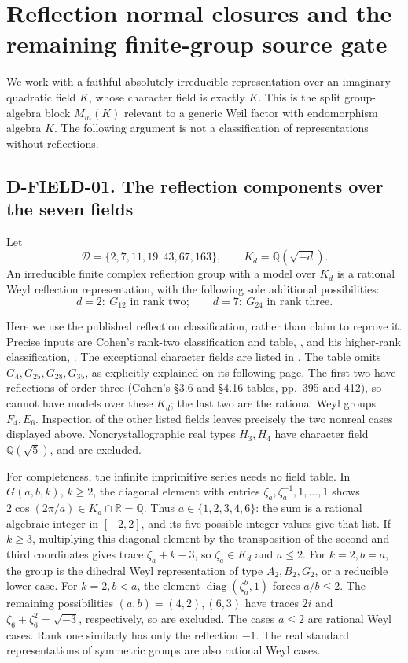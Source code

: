 \section{Reflection normal closures and the remaining finite-group source gate}
\label{sec:reflection-reduction}

We work with a faithful absolutely irreducible representation over an
imaginary quadratic field \(K\), whose character field is exactly \(K\).
This is the split group-algebra block \(M_m(K)\) relevant to a generic
Weil factor with endomorphism algebra \(K\). The following argument is
not a classification of representations without reflections.

\subsection*{D-FIELD-01. The reflection components over the seven fields}

Let
\[
 \mathcal D=\{2,7,11,19,43,67,163\},\qquad K_d=\mathbb Q(\sqrt{-d}).
\]
An irreducible finite complex reflection group with a model over \(K_d\)
is a rational Weyl reflection representation, with the following sole
additional possibilities:
\[
  d=2:\ G_{12}\text{ in rank two};\qquad
  d=7:\ G_{24}\text{ in rank three}.
\]

Here we use the published reflection classification, rather than claim
to reprove it. Precise inputs are Cohen's rank-two classification and
table, \cite[\S\S3.4--3.6, pp.~394--395]{FIELD:Cohen}, and his
higher-rank classification, \cite[Theorem 5.12, p.~435]{FIELD:Cohen}.
The exceptional character fields are listed in
\cite[Tables 8.1--8.2, pp.~674--675]{FIELD:Malle}.
The table omits \(G_4,G_{25},G_{28},G_{35}\), as explicitly explained
on its following page. The first two have reflections of order three
(Cohen's \S3.6 and \S4.16 tables, pp.~395 and 412), so cannot have
models over these \(K_d\); the last two are the rational Weyl groups
\(F_4,E_6\). Inspection of the other listed fields leaves precisely
the two nonreal cases displayed above. Noncrystallographic real types
\(H_3,H_4\) have character field \(\mathbb Q(\sqrt5)\), and are excluded.

For completeness, the infinite imprimitive series needs no field table.
In \(G(a,b,k)\), \(k\ge2\), the diagonal element with entries
\(\zeta_a,\zeta_a^{-1},1,\ldots,1\) shows
\(2\cos(2\pi/a)\in K_d\cap\mathbb R=\mathbb Q\). Thus
\(a\in\{1,2,3,4,6\}\): the sum is a rational algebraic integer in
\([-2,2]\), and its five possible integer values give that list.
If \(k\ge3\), multiplying this diagonal element by the transposition
of the second and third coordinates gives trace
\(\zeta_a+k-3\), so \(\zeta_a\in K_d\) and \(a\le2\).
For \(k=2,b=a\), the group is the dihedral Weyl representation of
type \(A_2,B_2,G_2\), or a reducible lower case. For \(k=2,b<a\),
the element \(\operatorname{diag}(\zeta_a^b,1)\) forces
\(a/b\le2\). The remaining possibilities \((a,b)=(4,2),(6,3)\)
have traces \(2i\) and \(\zeta_6+\zeta_6^2=\sqrt{-3}\), respectively,
so are excluded. The cases \(a\le2\) are rational Weyl cases.
Rank one similarly has only the reflection \(-1\). The real standard
representations of symmetric groups are also rational Weyl cases.

